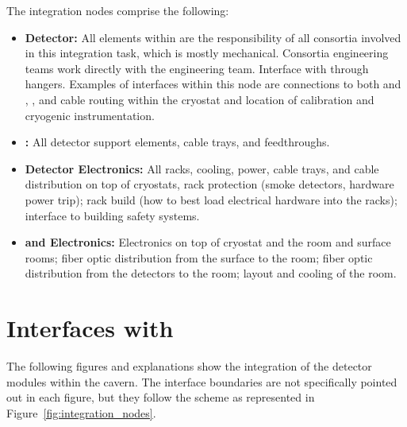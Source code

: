 The integration nodes comprise the following:
\begin{itemize}
\item {\bf Detector:} All  elements within  are the responsibility of all consortia involved in
  this integration task, which is mostly mechanical. Consortia
  engineering teams work directly with the  engineering team.
  Interface with   through hangers. Examples of interfaces within
  this node are  connections to both  and , , and
   cable routing within the cryostat and location of calibration and
  cryogenic instrumentation. 
\item {\bf {}:} All detector support elements,
  cable trays, and feedthroughs.
\item {\bf Detector Electronics:} All racks, cooling, power, cable
  trays, and cable distribution on top of cryostats, rack protection
  (smoke detectors, hardware power trip); rack build (how to best load electrical hardware into the racks); interface to
  building safety systems. 
\item {\bf {} and Electronics:} Electronics on top of cryostat and
  the   room and surface rooms; fiber optic distribution from
  the surface to the   room; fiber optic distribution from the
  detectors to the   room; layout and cooling of the  
  room. 
\end{itemize}

\section{Interfaces with }
\label{sec:inter-lbnf-interf}
The following figures and explanations show the
integration of the detector modules within the cavern. The interface
boundaries are not specifically pointed out in each figure, but they
follow the scheme as represented in
Figure~\ref{fig:integration_nodes}.

